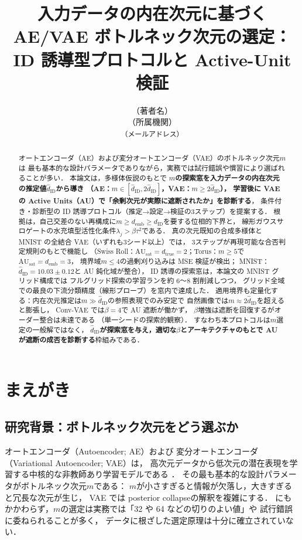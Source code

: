 \documentclass[11pt,a4paper]{jsarticle}
\title{入力データの内在次元に基づく AE/VAE ボトルネック次元の選定：\\
ID 誘導型プロトコルと Active-Unit 検証}
\author{（著者名）\\
{\small （所属機関）}\\
{\small \texttt{（メールアドレス）}}}
\date{}
\newcommand{\dID}{d_{\mathrm{ID}}}
\newcommand{\hatdID}{\hat{d}_{\mathrm{ID}}}
\newcommand{\dtrue}{d_{\mathrm{true}}}
\newcommand{\AUsat}{\mathrm{AU}_{\mathrm{sat}}}
\newcommand{\demb}{d_{\mathrm{emb}}}
\begin{document}
\maketitle

\begin{abstract}
オートエンコーダ（AE）および変分オートエンコーダ（VAE）のボトルネック次元$m$は
最も基本的な設計パラメータでありながら，実務では試行錯誤や慣習により選ばれることが多い．
本論文は，多様体仮説のもとで
\textbf{$m$の探索窓を入力データの内在次元の推定値$\hatdID$から導き
（AE：$m \in [\hatdID, 2\hatdID]$，VAE：$m \geq 2\hatdID$），
学習後に VAE の Active Units（AU）で「余剰次元が実際に遮断されたか」を診断する}，
条件付き・診断型の ID 誘導プロトコル（推定→設定→検証の3ステップ）を提案する．
根拠は，自己交差のない再構成に$m \geq \demb \geq \dID$を要する位相的下界と，
線形ガウスサロゲートの水充填型活性化条件$\lambda_j > \beta\tau^2$である．
真の次元既知の合成多様体と MNIST の全結合 VAE（いずれも3シード以上）では，
3ステップが再現可能な合否判定規則のもとで機能し
（Swiss Roll：$\AUsat = \dtrue = 2$；Torus：$m \geq 5$で$\AUsat = \demb = 3$，
境界域$m \leq 4$の過剰刈り込みは MSE 検証が検出；
MNIST：$\hatdID = 10.03 \pm 0.12$と AU 鈍化域が整合），
ID 誘導の探索窓は，本論文の MNIST グリッド構成では
フルグリッド探索の学習ランを約 6〜8 割削減しつつ，
グリッド全域での最良の下流分類精度（線形プローブ）を窓内で達成した．
適用境界も定量化する：内在次元推定は$m \gg \hatdID$の参照表現でのみ安定で
自然画像では$m \approx 2\hatdID$を超えると膨張し，
Conv-VAE では$\beta = 4$で AU 遮断が働かず，
$\beta$増強は遮断を回復するがオーダー整合は未達である
（単一シードの探索的観察）．
すなわち本プロトコルは$m$選定の一般解ではなく，
\textbf{$\hatdID$が探索窓を与え，適切な$\beta$とアーキテクチャのもとで
AU が遮断の成否を診断する}枠組みである．
\end{abstract}

\section{まえがき}\label{sec:intro}

\subsection{研究背景：ボトルネック次元をどう選ぶか}\label{sec:intro_bg}

オートエンコーダ（Autoencoder; AE）および
変分オートエンコーダ（Variational Autoencoder; VAE）\cite{kingma2014vae}は，
高次元データから低次元の潜在表現を学習する中核的な非教師あり学習モデルである
\cite{bengio2013representation}．
その最も基本的な設計パラメータがボトルネック次元$m$である：
$m$が小さすぎると情報が欠落し，大きすぎると冗長な次元が生じ，
VAE では posterior collapse\cite{lucas2019elbo}の解釈を複雑にする．
にもかかわらず，$m$の選定は実務では「32 や 64 などの切りのよい値」や
試行錯誤に委ねられることが多く，
データに根ざした選定原理は十分に確立されていない．
\end{document}
